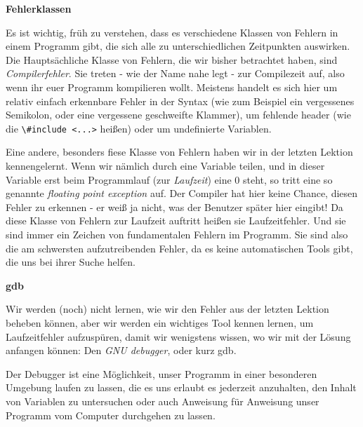 
\textbf{Fehlerklassen}

Es ist wichtig, früh zu verstehen, dass es verschiedene Klassen von Fehlern in
einem \Cpp Programm gibt, die sich alle zu unterschiedlichen Zeitpunkten
auswirken. Die Hauptsächliche Klasse von Fehlern, die wir bisher betrachtet
haben, sind \emph{Compilerfehler}. Sie treten - wie der Name nahe legt - zur
Compilezeit auf, also wenn ihr euer Programm kompilieren wollt. Meistens
handelt es sich hier um relativ einfach erkennbare Fehler in der Syntax (wie
zum Beispiel ein vergessenes Semikolon, oder eine vergessene geschweifte
Klammer), um fehlende header (wie die \verb|\#include <...>| heißen) oder um
undefinierte Variablen.

Eine andere, besonders fiese Klasse von Fehlern haben wir in der letzten
Lektion kennengelernt. Wenn wir nämlich durch eine Variable teilen, und in
dieser Variable erst beim Programmlauf (zur \emph{Laufzeit}) eine 0 steht, so
tritt eine so genannte \emph{floating point exception} auf. Der Compiler hat
hier keine Chance, diesen Fehler zu erkennen - er weiß ja nicht, was der
Benutzer später hier eingibt! Da diese Klasse von Fehlern zur Laufzeit auftritt
heißen sie Laufzeitfehler. Und sie sind immer ein Zeichen von fundamentalen
Fehlern im Programm. Sie sind also die am schwersten aufzutreibenden Fehler, da
es keine automatischen Tools gibt, die uns bei ihrer Suche helfen.

\textbf{gdb}

Wir werden (noch) nicht lernen, wie wir den Fehler aus der letzten Lektion
beheben können, aber wir werden ein wichtiges Tool kennen lernen, um
Laufzeitfehler aufzuspüren, damit wir wenigstens wissen, wo wir mit der Lösung
anfangen können: Den \emph{GNU debugger}, oder kurz gdb.

Der Debugger ist eine Möglichkeit, unser Programm in einer besonderen Umgebung
laufen zu lassen, die es uns erlaubt es jederzeit anzuhalten, den Inhalt von
Variablen zu untersuchen oder auch Anweisung für Anweisung unser Programm vom
Computer durchgehen zu lassen.

